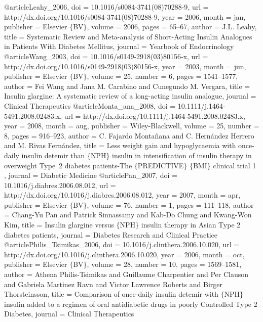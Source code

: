 @article{Leahy_2006,
	doi = {10.1016/s0084-3741(08)70288-9},
	url = {http://dx.doi.org/10.1016/s0084-3741(08)70288-9},
	year = 2006,
	month = {jan},
	publisher = {Elsevier $\lbrace$BV$\rbrace$},
	volume = {2006},
	pages = {65--67},
	author = {J.L. Leahy},
	title = {Systematic Review and Meta-analysis of Short-Acting Insulin Analogues in Patients With Diabetes Mellitus},
	journal = {Yearbook of Endocrinology}
}
@article{Wang_2003,
	doi = {10.1016/s0149-2918(03)80156-x},
	url = {http://dx.doi.org/10.1016/s0149-2918(03)80156-x},
	year = 2003,
	month = {jun},
	publisher = {Elsevier $\lbrace$BV$\rbrace$},
	volume = {25},
	number = {6},
	pages = {1541--1577},
	author = {Fei Wang and Jana M. Carabino and Cunegundo M. Vergara},
	title = {Insulin glargine: A systematic review of a long-acting insulin analogue},
	journal = {Clinical Therapeutics}
}
@article{Monta_ana_2008,
	doi = {10.1111/j.1464-5491.2008.02483.x},
	url = {http://dx.doi.org/10.1111/j.1464-5491.2008.02483.x},
	year = 2008,
	month = {aug},
	publisher = {Wiley-Blackwell},
	volume = {25},
	number = {8},
	pages = {916--923},
	author = {C. Fajardo Monta{\~{n}}ana and C. Hern{\'{a}}ndez Herrero and M. Rivas Fern{\'{a}}ndez},
	title = { Less weight gain and hypoglycaemia with once-daily insulin detemir than $\lbrace$NPH$\rbrace$ insulin in intensification of insulin therapy in overweight Type~2 diabetes patients-The $\lbrace$PREDICTIVE$\rbrace${\texttrademark} $\lbrace$BMI$\rbrace$ clinical trial 1 },
	journal = {Diabetic Medicine}
}
@article{Pan_2007,
	doi = {10.1016/j.diabres.2006.08.012},
	url = {http://dx.doi.org/10.1016/j.diabres.2006.08.012},
	year = 2007,
	month = {apr},
	publisher = {Elsevier $\lbrace$BV$\rbrace$},
	volume = {76},
	number = {1},
	pages = {111--118},
	author = {Chang-Yu Pan and Patrick Sinnassamy and Kab-Do Chung and Kwang-Won Kim},
	title = {Insulin glargine versus $\lbrace$NPH$\rbrace$ insulin therapy in Asian Type 2 diabetes patients},
	journal = {Diabetes Research and Clinical Practice}
}
@article{Philis_Tsimikas_2006,
	doi = {10.1016/j.clinthera.2006.10.020},
	url = {http://dx.doi.org/10.1016/j.clinthera.2006.10.020},
	year = 2006,
	month = {oct},
	publisher = {Elsevier $\lbrace$BV$\rbrace$},
	volume = {28},
	number = {10},
	pages = {1569--1581},
	author = {Athena Philis-Tsimikas and Guillaume Charpentier and Per Clauson and Gabriela Martinez Ravn and Victor Lawrence Roberts and Birger Thorsteinsson},
	title = {Comparison of once-daily insulin detemir with $\lbrace$NPH$\rbrace$ insulin added to a regimen of oral antidiabetic drugs in poorly Controlled Type 2 Diabetes},
	journal = {Clinical Therapeutics}
}

